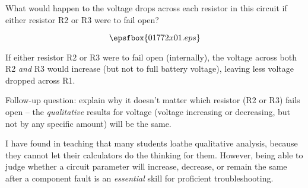 

What would happen to the voltage drops across each resistor in this circuit if either resistor R2 or R3 were to fail open?

$$\epsfbox{01772x01.eps}$$







If either resistor R2 or R3 were to fail open (internally), the voltage across both R2 {\it and} R3 would increase (but not to full battery voltage), leaving less voltage dropped across R1.

\vskip 10pt

Follow-up question: explain why it doesn't matter which resistor (R2 or R3) fails open -- the {\it qualitative} results for voltage (voltage increasing or decreasing, but not by any specific amount) will be the same.







I have found in teaching that many students loathe qualitative analysis, because they cannot let their calculators do the thinking for them.  However, being able to judge whether a circuit parameter will increase, decrease, or remain the same after a component fault is an {\it essential} skill for proficient troubleshooting.




